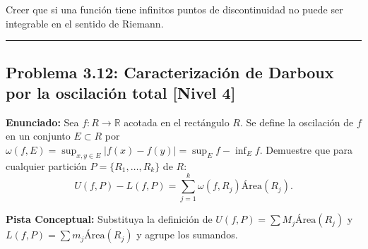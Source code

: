 \documentclass[11pt,a4paper]{article}
\begin{document}
\begin{trapbox}
Creer que si una función tiene infinitos puntos de discontinuidad no puede ser integrable en el sentido de Riemann.
\end{trapbox}

\vspace{0.5cm}
\hrule
\vspace{0.5cm}

\subsection*{Problema 3.12: Caracterización de Darboux por la oscilación total \hfill \color{primaryblue}\small[Nivel 4]}

\begin{tcolorbox}[colback=white,colframe=gray!40,arc=1mm,boxrule=0.5pt,left=3mm,right=3mm,top=2mm,bottom=2mm]
\textbf{Enunciado:} Sea $f: R \to \mathbb{R}$ acotada en el rectángulo $R$. Se define la oscilación de $f$ en un conjunto $E \subset R$ por $\omega(f, E) = \sup_{x,y \in E} |f(x) - f(y)| = \sup_E f - \inf_E f$. Demuestre que para cualquier partición $P = \{R_1, \dots, R_k\}$ de $R$:
\begin{equation*}
U(f, P) - L(f, P) = \sum_{j=1}^k \omega(f, R_j) \text{Área}(R_j).
\end{equation*}
\end{tcolorbox}

\begin{tcolorbox}[colback=yellow!4,colframe=accentamber!70,arc=1mm,boxrule=0.5pt,left=3mm,right=3mm,top=1.5mm,bottom=1.5mm]
\textbf{Pista Conceptual:} Substituya la definición de $U(f,P) = \sum M_j \text{Área}(R_j)$ y $L(f,P) = \sum m_j \text{Área}(R_j)$ y agrupe los sumandos.
\end{tcolorbox}
\end{document}
